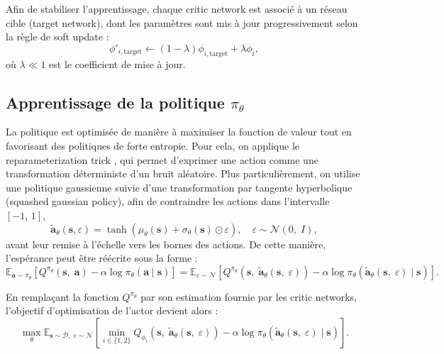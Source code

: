 \vspace{10pt}

\noindent Afin de stabiliser l'apprentissage, chaque critic network est associé à un réseau cible (target network), dont les paramètres sont mis à jour progressivement selon la règle de soft update :
$$
    \phi'_{i, \text{target}} \leftarrow (1 - \lambda)\phi_{i, \text{target}} + \lambda \phi_i,
$$
\noindent où $\lambda \ll 1$ est le coefficient de mise à jour.




\subsection{Apprentissage de la politique $\pi_\theta$}

\noindent La politique est optimisée de manière à maximiser la fonction de valeur tout en favorisant des politiques de forte entropie. Pour cela, on applique le reparameterization trick  \citep{kingma2022}, qui permet d'exprimer une action comme une transformation déterministe d'un bruit aléatoire. Plus particulièrement, on utilise une politique gaussienne suivie d'une transformation par tangente hyperbolique (squashed gaussian policy), afin de contraindre les actions dans l'intervalle $[-1, \, 1]$,
$$
    \tilde{\mathbf{a}}_\theta (\mathbf{s}, \varepsilon) = \tanh (\mu_\theta(\mathbf{s}) + \sigma_\theta(\mathbf{s}) \odot \varepsilon),
    \quad
    \varepsilon \sim \mathcal{N}(0, \; I),
$$
avant leur remise à l'échelle vers les bornes des actions. De cette manière, l'espérance peut être réécrite sous la forme :
$$
    \mathbb{E}_{\mathbf{a} \sim \pi_\theta} [Q^{\pi_\theta}(\mathbf{s}, \; \mathbf{a} ) - \alpha \log \pi_\theta(\mathbf{a} \mid \mathbf{s})] = \mathbb{E}_{\varepsilon \sim \mathcal{N}}[Q^{\pi_\theta}(\mathbf{s}, \; \tilde{\mathbf{a}}_\theta (\mathbf{s}, \; \varepsilon) ) - \alpha \log \pi_\theta(\tilde{\mathbf{a}}_\theta (\mathbf{s}, \; \varepsilon) \mid \mathbf{s})].
$$

\vspace{10pt}

\noindent En remplaçant la fonction $Q^{\pi_\theta}$ par son estimation fournie par les critic networks, l'objectif d'optimisation de l'actor devient alors :
$$
    \max_\theta \mathbb{E}_{\mathbf{s} \sim \mathcal{D}, \; \varepsilon \sim \mathcal{N}} \left[ \min_{i \in \{1, 2\}}Q_{\phi_i}(\mathbf{s}, \; \tilde{\mathbf{a}}_\theta (\mathbf{s}, \; \varepsilon)) -  \alpha \log \pi_\theta(\tilde{\mathbf{a}}_\theta (\mathbf{s}, \; \varepsilon) \mid \mathbf{s})\right].
$$

